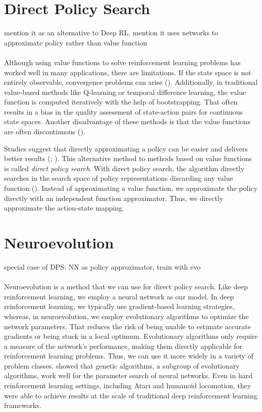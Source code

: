 
\section{Direct Policy Search}
mention it as an alternative to Deep RL, mention it uses networks to approximate policy rather than value function \\ \\
Although using value functions to solve reinforcement learning problems has worked well in many applications, there are limitations. If the state space is not entirely observable, convergence problems can arise (\cite{el2005direct}). Additionally, in traditional value-based methods like Q-learning or temporal difference learning, the value function is computed iteratively with the help of bootstrapping. That often results in a bias in the quality assessment of state-action pairs for continuous state spaces. Another disadvantage of these methods is that the value functions are often discontinuous (\cite{deisenroth2013survey}).

Studies suggest that directly approximating a policy can be easier and delivers better results (\cite{sutton1999policy}; \cite{anderson2000approximating}). This alternative method to methods based on value functions is called \textit{direct policy search}. With direct policy search, the algorithm directly searches in the search space of policy representations discarding any value function (\cite{wierstra2010study}). Instead of approximating a value function, we approximate the policy directly with an independent function approximator. Thus, we directly approximate the action-state mapping.


\section{Neuroevolution}
special case of DPS: NN as policy approximator, train with evo \\ \\
Neuroevolution is a method that we can use for direct policy search. Like deep reinforcement learning, we employ a neural network as our model. In deep reinforcement learning, we typically use gradient-based learning strategies, whereas, in neuroevolution, we employ evolutionary algorithms to optimize the network parameters. That reduces the risk of being unable to estimate accurate gradients or being stuck in a local optimum. Evolutionary algorithms only require a measure of the network's performance, making them directly applicable for reinforcement learning problems. Thus, we can use it more widely in a variety of problem classes. \cite{such2017deep} showed that genetic algorithms, a subgroup of evolutionary algorithms, work well for the parameter search of neural networks. Even in hard reinforcement learning settings, including Atari and humanoid locomotion, they were able to achieve results at the scale of traditional deep reinforcement learning frameworks.

